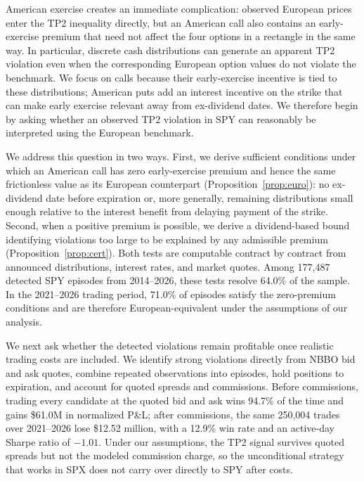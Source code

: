 \documentclass[sigconf]{acmart}
\begin{document}
American exercise creates an immediate complication: observed European prices enter the TP2 inequality directly, but an American call also contains an early-exercise premium that need not affect the four options in a rectangle in the same way. In particular, discrete cash distributions can generate an apparent TP2 violation even when the corresponding European option values do not violate the benchmark. We focus on calls because their early-exercise incentive is tied to these distributions; American puts add an interest incentive on the strike that can make early exercise relevant away from ex-dividend dates. We therefore begin by asking whether an observed TP2 violation in SPY can reasonably be interpreted using the European benchmark.

We address this question in two ways. First, we derive sufficient conditions under which an American call has zero early-exercise premium and hence the same frictionless value as its European counterpart (Proposition~\ref{prop:euro}): no ex-dividend date before expiration or, more generally, remaining distributions small enough relative to the interest benefit from delaying payment of the strike. Second, when a positive premium is possible, we derive a dividend-based bound identifying violations too large to be explained by any admissible premium (Proposition~\ref{prop:cert}). Both tests are computable contract by contract from announced distributions, interest rates, and market quotes. Among 177{,}487 detected SPY episodes from 2014--2026, these tests resolve 64.0\% of the sample. In the 2021--2026 trading period, 71.0\% of episodes satisfy the zero-premium conditions and are therefore European-equivalent under the assumptions of our analysis.

We next ask whether the detected violations remain profitable once realistic trading costs are included. We identify strong violations directly from NBBO bid and ask quotes, combine repeated observations into episodes, hold positions to expiration, and account for quoted spreads and commissions. Before commissions, trading every candidate at the quoted bid and ask wins 94.7\% of the time and gains \$61.0M in normalized P\&L; after commissions, the same 250{,}004 trades over 2021--2026 lose \$12.52 million, with a 12.9\% win rate and an active-day Sharpe ratio of $-1.01$. Under our assumptions, the TP2 signal survives quoted spreads but not the modeled commission charge, so the unconditional strategy that works in SPX does not carry over directly to SPY after costs.
\end{document}
